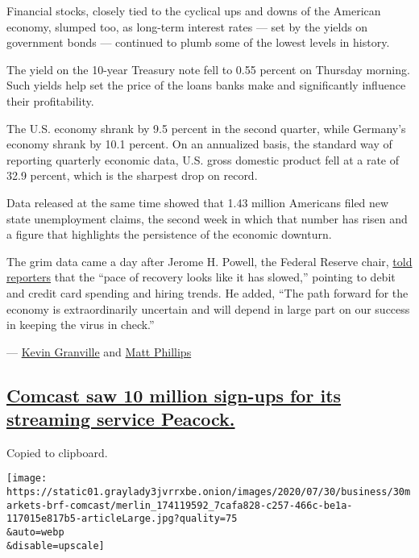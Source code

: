 Financial stocks, closely tied to the cyclical ups and downs of the
American economy, slumped too, as long-term interest rates --- set by
the yields on government bonds --- continued to plumb some of the lowest
levels in history.

The yield on the 10-year Treasury note fell to 0.55 percent on Thursday
morning. Such yields help set the price of the loans banks make and
significantly influence their profitability.

The U.S. economy shrank by 9.5 percent in the second quarter, while
Germany's economy shrank by 10.1 percent. On an annualized basis, the
standard way of reporting quarterly economic data, U.S. gross domestic
product fell at a rate of 32.9 percent, which is the sharpest drop on
record.

Data released at the same time showed that 1.43 million Americans filed
new state unemployment claims, the second week in which that number has
risen and a figure that highlights the persistence of the economic
downturn.

The grim data came a day after Jerome H. Powell, the Federal Reserve
chair,
\href{https://www.nytimes3xbfgragh.onion/2020/07/29/business/economy/federal-reserve-meeting-interest-rates.html}{told
reporters} that the ``pace of recovery looks like it has slowed,''
pointing to debit and credit card spending and hiring trends. He added,
``The path forward for the economy is extraordinarily uncertain and will
depend in large part on our success in keeping the virus in check.''

--- \href{https://www.nytimes3xbfgragh.onion/by/kevin-granville}{Kevin
Granville} and
\href{https://www.nytimes3xbfgragh.onion/by/matt-phillips}{Matt
Phillips}

\hypertarget{comcast-saw-10-million-sign-ups-for-its-streaming-service-peacock}{%
\subsection{\texorpdfstring{\protect\hyperlink{comcast-saw-10-million-sign-ups-for-its-streaming-service-peacock}{Comcast
saw 10 million sign-ups for its streaming service
Peacock.}}{Comcast saw 10 million sign-ups for its streaming service Peacock.}}\label{comcast-saw-10-million-sign-ups-for-its-streaming-service-peacock}}

Copied to clipboard.

\texttt{[image: https://static01.graylady3jvrrxbe.onion/images/2020/07/30/business/30markets-brf-comcast/merlin\_174119592\_7cafa828-c257-466c-be1a-117015e817b5-articleLarge.jpg?quality=75\\\&auto=webp\\\&disable=upscale]}

